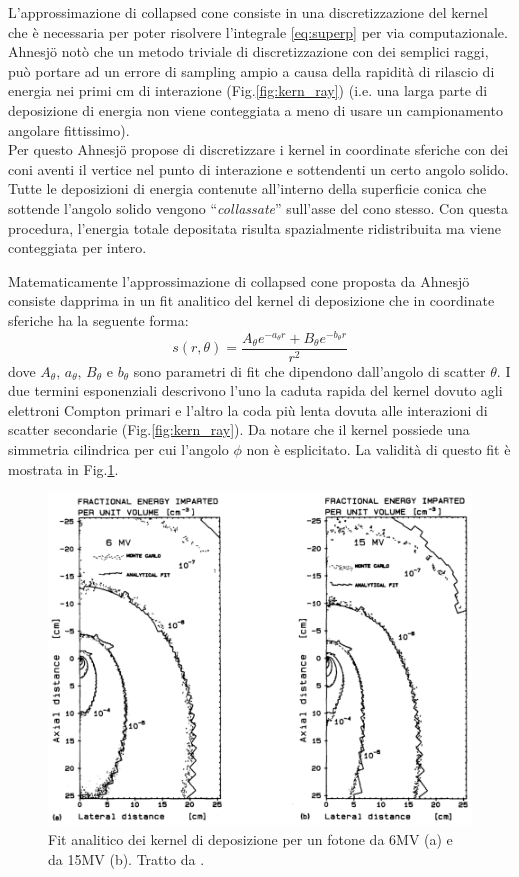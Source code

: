 {L'approssimazione di collapsed cone consiste in una discretizzazione del kernel che è necessaria per poter risolvere l'integrale \eqref{eq:superp} per via computazionale. Ahnesj\"{o} notò che un metodo triviale di discretizzazione con dei semplici raggi, può portare ad un errore di sampling ampio a causa della rapidità di rilascio di energia nei primi cm di interazione \cite{Ahnesjo1989} (Fig.\ref{fig:kern_ray}) (i.e. una larga parte di deposizione di energia non viene conteggiata a meno di usare un campionamento angolare fittissimo).\\
Per questo Ahnesj\"{o} propose di discretizzare i kernel in coordinate sferiche con dei coni aventi il vertice nel punto di interazione e sottendenti un certo angolo solido. Tutte le deposizioni di energia contenute all'interno della superficie conica che sottende l'angolo solido vengono \textquotedblleft\textit{collassate}\textquotedblright{} sull'asse del cono stesso. Con questa procedura, l'energia totale depositata risulta spazialmente ridistribuita ma viene conteggiata per intero.

Matematicamente l'approssimazione di collapsed cone proposta da Ahnesj\"{o} consiste dapprima in un fit analitico del kernel di deposizione che in coordinate sferiche ha la seguente forma:
\begin{equation}
\label{eq:kern_fit}
s(r,\theta) = \frac{A_\theta e^{-a_\theta r} + B_\theta e^{-b_\theta r}}{r^2}
\end{equation}
dove $A_\theta,\,a_\theta,\,B_\theta$ e $b_\theta$ sono parametri di fit che dipendono dall'angolo di scatter $\theta$. I due termini esponenziali descrivono l'uno la caduta rapida del kernel dovuto agli elettroni Compton primari e l'altro la coda più lenta dovuta alle interazioni di scatter secondarie (Fig.\ref{fig:kern_ray}). Da notare che il kernel possiede una simmetria cilindrica per cui l'angolo $\phi$ non è esplicitato. La validità di questo fit è mostrata in Fig.\ref{fig:kern_fit}.
\begin{figure}
\centering
\includegraphics[width=.8\textwidth]{./cap1/kern_fit.png}
\caption{Fit analitico dei kernel di deposizione per un fotone da 6MV (a) e da 15MV (b). Tratto da \cite{Ahnesjo1989}.}
\label{fig:kern_fit}
\end{figure}

}
